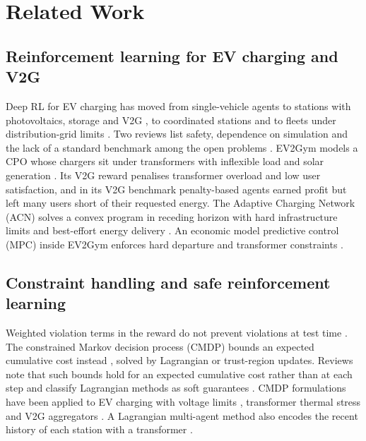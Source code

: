 \section{Related Work}\label{sec:related}

\subsection{Reinforcement learning for EV charging and V2G}\label{sec:rw-rl}

Deep RL for EV charging has moved from single-vehicle agents \cite{li2020constrained} to stations with photovoltaics, storage and V2G \cite{korkas2024distributed,zhang2025dumes}, to coordinated stations \cite{song2025longterm} and to fleets under distribution-grid limits \cite{zhang2024hamlet,caballe2026largescale}.
Two reviews list safety, dependence on simulation and the lack of a standard benchmark among the open problems \cite{qiu2023reinforcement,michailidis2025reinforcement}.
EV2Gym models a CPO whose chargers sit under transformers with inflexible load and solar generation \cite{orfanoudakis2025ev2gym}.
Its V2G reward penalises transformer overload and low user satisfaction, and in its V2G benchmark penalty-based agents earned profit but left many users short of their requested energy.
The Adaptive Charging Network (ACN) solves a convex program in receding horizon with hard infrastructure limits and best-effort energy delivery \cite{lee2021adaptive}.
An economic model predictive control (MPC) inside EV2Gym enforces hard departure and transformer constraints \cite{diazlondono2026open}.

\subsection{Constraint handling and safe reinforcement learning}\label{sec:rw-safe}

Weighted violation terms in the reward do not prevent violations at test time \cite{tabas2022computationally,orfanoudakis2025ev2gym}.
The constrained Markov decision process (CMDP) bounds an expected cumulative cost instead \cite{altman2021constrained}, solved by Lagrangian \cite{tessler2018reward} or trust-region \cite{achiam2017constrained} updates.
Reviews note that such bounds hold for an expected cumulative cost rather than at each step \cite{gu2024review} and classify Lagrangian methods as soft guarantees \cite{su2025review}.
CMDP formulations have been applied to EV charging with voltage limits \cite{fan2024safety}, transformer thermal stress \cite{zhang2025modelfree,zhang2026safe} and V2G aggregators \cite{eland2026safe}.
A Lagrangian multi-agent method also encodes the recent history of each station with a transformer \cite{huang2026safe}.

